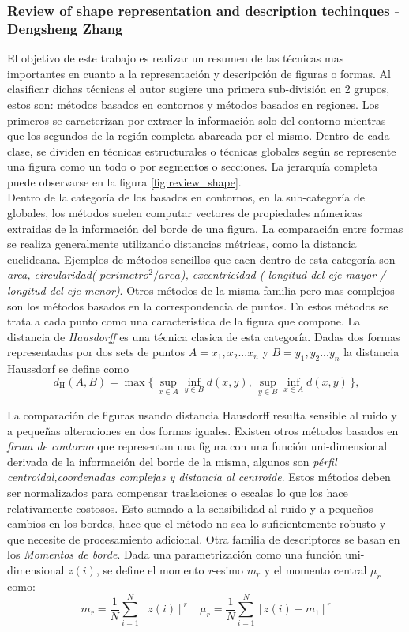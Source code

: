 	\subsubsection{Review of shape representation and description techinques - Dengsheng Zhang}
El objetivo de este trabajo es realizar un resumen de las técnicas mas 
importantes en cuanto a la representación y descripción de figuras o 
formas.
Al clasificar dichas técnicas el autor sugiere una primera sub-división en 2 grupos, estos son: métodos basados en contornos y métodos basados 
en regiones. Los primeros se caracterizan por extraer  la información solo del contorno mientras que los segundos de la región completa abarcada
por el mismo. Dentro de cada clase, se dividen en técnicas 
estructurales o técnicas globales según  se represente una figura como un todo o 
por segmentos o secciones. La jerarquía completa puede observarse en la figura \ref{fig:review_shape}.\\
\indent Dentro de la categoría de los basados en contornos, en la sub-categoría de globales, los métodos suelen computar vectores de 
propiedades númericas extraidas de la información del borde de una 
figura. La comparación entre formas se realiza 
generalmente utilizando distancias métricas, como la distancia euclideana. Ejemplos de métodos sencillos que caen dentro de esta 
categoría son \textit{area, circularidad( $perimetro^2 / area$), 
excentricidad ( longitud del eje mayor / longitud del eje menor)}. Otros métodos 
de la misma familia pero mas complejos son los métodos basados en la correspondencia de puntos. En estos métodos se trata a cada punto como una 
caracteristica de la figura que compone. La distancia de \textit{ Hausdorff} es una técnica clasica de esta categoría. Dadas dos formas representadas
por dos sets de puntos $A={x_1,x_2...x_n}$ y $B={y_1,y_2...y_n}$ la distancia Haussdorf se define como 
\[
	 d_{\mathrm H}(A,B) = \max\{\,\sup_{x \in A} \inf_{y \in B} d(x,y),\, \sup_{y \in B} \inf_{x \in A} d(x,y)\,\}\mbox{,}
\] 

La comparación de figuras usando distancia Hausdorff resulta sensible 
al ruido y a pequeñas alteraciones en dos formas iguales. Existen otros métodos basados
en \textit{firma de contorno} que  representan una figura con una 
función uni-dimensional derivada de la información del borde de la 
misma, 
algunos son \textit{pérfil centroidal,coordenadas complejas y distancia al centroide}. Estos métodos deben ser normalizados para compensar
traslaciones o escalas lo que los hace relativamente costosos. Esto sumado a la sensibilidad al ruido y a pequeños cambios en los bordes, hace que el método 
no sea lo suficientemente robusto y que necesite de procesamiento adicional. Otra familia de descriptores se basan en los 
\textit{Momentos de borde}. Dada una parametrización como una función 
uni-dimensional $z(i)$, se define el momento \textit{r}-esimo \textit{$m_r$} 
y el momento central $\mu_r$ como:
\[
	m_r=\frac{1}{N} \sum_{i=1}^{N}{[z(i)]^r}\ \ \ \ \
	\mu_r=\frac{1}{N} \sum_{i=1}^{N}{[z(i) - m_1]^r}
\]

